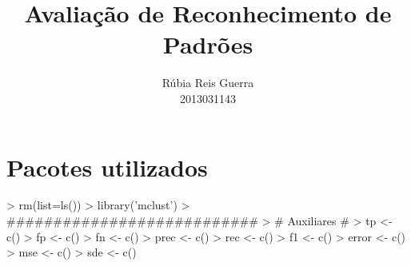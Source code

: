 \documentclass{article}
\title{Avaliação de Reconhecimento de Padrões}
\author{Rúbia Reis Guerra \\ 2013031143}
\begin{document}

\maketitle

\section{Pacotes utilizados}
\begin{Schunk}
\begin{Sinput}
> rm(list=ls())
> library('mclust')
> ###########################
> # Auxiliares #
> tp <- c()
> fp <- c()
> fn <- c()
> prec <- c()
> rec <- c()
> f1 <- c()
> error <- c()
> mse <- c()
> sde <- c()
\end{Sinput}
\end{Schunk}
\end{document}
